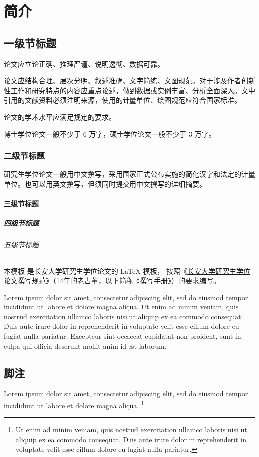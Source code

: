 
\chapter{简介}

\section{一级节标题}

论文应立论正确、推理严谨、说明透彻、数据可靠。

论文应结构合理、层次分明、叙述准确、文字简练、文图规范。对于涉及作者创新性工作和研究特点的内容应重点论述，做到数据或实例丰富、分析全面深入。文中引用的文献资料必须注明来源，使用的计量单位、绘图规范应符合国家标准。

论文的学术水平应满足规定的要求。

博士学位论文一般不少于 6 万字，硕士学位论文一般不少于 3 万字。

\subsection{二级节标题}

研究生学位论文一般用中文撰写，采用国家正式公布实施的简化汉字和法定的计量单位。也可以用英文撰写，但须同时提交用中文撰写的详细摘要。

\subsubsection{三级节标题}  

\paragraph{四级节标题}

\subparagraph{五级节标题}

本模板  是长安大学研究生学位论文的 \LaTeX{}
模板， 按照《\href{https://xxgk.chd.edu.cn/_mediafile/zerui87/2014/10/20/2opzjtyy3y.pdf}{长安大学研究生学位论文撰写规范}》（14年的老古董，以下简称《撰写手册》）的要求编写。

Lorem ipsum dolor sit amet, consectetur adipiscing elit, sed do eiusmod tempor
incididunt ut labore et dolore magna aliqua.
Ut enim ad minim veniam, quis nostrud exercitation ullamco laboris nisi ut
aliquip ex ea commodo consequat.
Duis aute irure dolor in reprehenderit in voluptate velit esse cillum dolore eu
fugiat nulla pariatur.
Excepteur sint occaecat cupidatat non proident, sunt in culpa qui officia
deserunt mollit anim id est laborum.



\section{脚注}

Lorem ipsum dolor sit amet, consectetur adipiscing elit, sed do eiusmod tempor
incididunt ut labore et dolore magna aliqua.
\footnote{Ut enim ad minim veniam, quis nostrud exercitation ullamco laboris
  nisi ut aliquip ex ea commodo consequat.
  Duis aute irure dolor in reprehenderit in voluptate velit esse cillum dolore
  eu fugiat nulla pariatur.}
